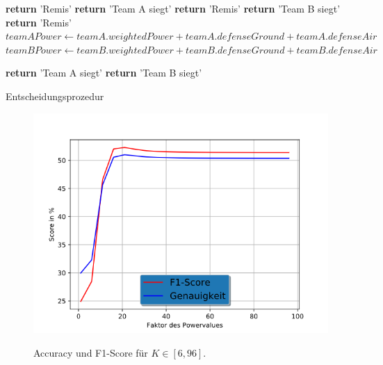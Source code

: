 \begin{algorithm}
\begin{algorithmic}[1]
	\State \textbf{return} 'Remis' 
\EndIf
{}
		\State \textbf{return} 'Team A siegt'
	\Else 
		\State \textbf{return} 'Remis'
	\EndIf
\EndIf
{}
	\State \textbf{return} 'Team B siegt'
\Else 
	\State \textbf{return} 'Remis' 
\EndIf
\EndIf
\State $teamAPower \leftarrow teamA.weightedPower + teamA.defenseGround + teamA.defenseAir$
\State $teamBPower \leftarrow teamB.weightedPower + teamB.defenseGround + teamB.defenseAir$

	\State \textbf{return} 'Team A siegt'
\Else
	\State \textbf{return} 'Team B siegt'
\EndIf
\EndProcedure
\end{algorithmic}
\caption{Entscheidungsprozedur}
\label{alg:decider}
\end{algorithm}

\begin{figure}[H]
\centering
\includegraphics[scale=0.8]{pictures/konstantenVollesModell}
\label{fig:konstante_baseline}
\caption{Accuracy und F1-Score für $K \in [6, 96]$.}
\end{figure}
 
